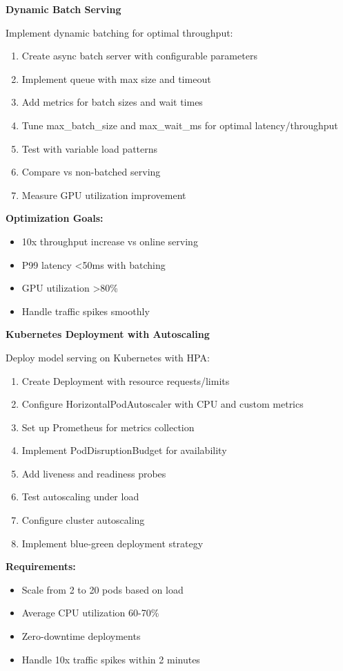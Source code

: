 \begin{exercise}
\textbf{Dynamic Batch Serving}

Implement dynamic batching for optimal throughput:

\begin{enumerate}
    \item Create async batch server with configurable parameters
    \item Implement queue with max size and timeout
    \item Add metrics for batch sizes and wait times
    \item Tune max\_batch\_size and max\_wait\_ms for optimal latency/throughput
    \item Test with variable load patterns
    \item Compare vs non-batched serving
    \item Measure GPU utilization improvement
\end{enumerate}

\textbf{Optimization Goals:}
\begin{itemize}
    \item 10x throughput increase vs online serving
    \item P99 latency <50ms with batching
    \item GPU utilization >80\%
    \item Handle traffic spikes smoothly
\end{itemize}
\end{exercise}

\begin{exercise}
\textbf{Kubernetes Deployment with Autoscaling}

Deploy model serving on Kubernetes with HPA:

\begin{enumerate}
    \item Create Deployment with resource requests/limits
    \item Configure HorizontalPodAutoscaler with CPU and custom metrics
    \item Set up Prometheus for metrics collection
    \item Implement PodDisruptionBudget for availability
    \item Add liveness and readiness probes
    \item Test autoscaling under load
    \item Configure cluster autoscaling
    \item Implement blue-green deployment strategy
\end{enumerate}

\textbf{Requirements:}
\begin{itemize}
    \item Scale from 2 to 20 pods based on load
    \item Average CPU utilization 60-70\%
    \item Zero-downtime deployments
    \item Handle 10x traffic spikes within 2 minutes
\end{itemize}
\end{exercise}

